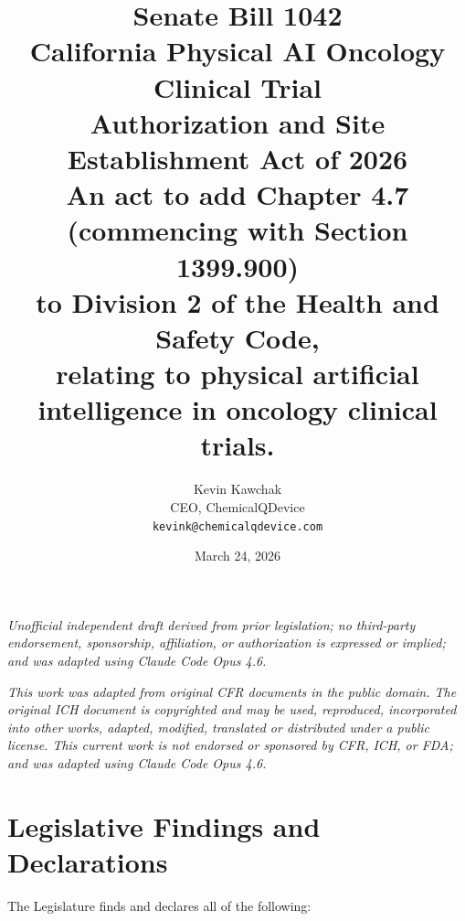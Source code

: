 \documentclass[11pt,letterpaper]{article}
\title{%
  \textbf{Senate Bill 1042}\\[6pt]
  \large California Physical AI Oncology Clinical Trial\\
  Authorization and Site Establishment Act of 2026\\[6pt]
  \normalsize An act to add Chapter 4.7 (commencing with Section 1399.900)\\
  to Division 2 of the Health and Safety Code,\\
  relating to physical artificial intelligence in oncology clinical trials.
}
\author{%
  Kevin Kawchak\\
  CEO, ChemicalQDevice\\
  \texttt{kevink@chemicalqdevice.com}
}
\date{March 24, 2026}
\begin{document}
\maketitle
\thispagestyle{fancy}

\begin{center}
\footnotesize
\textit{Unofficial independent draft derived from prior legislation;
no third-party endorsement, sponsorship, affiliation, or authorization
is expressed or implied; and was adapted using Claude Code Opus 4.6.}
\end{center}

\vspace{0.5em}

\begin{center}
\footnotesize
\textit{This work was adapted from original CFR documents in the public domain.
The original ICH document is copyrighted and may be used, reproduced,
incorporated into other works, adapted, modified, translated or distributed
under a public license. This current work is not endorsed or sponsored by
CFR, ICH, or FDA; and was adapted using Claude Code Opus 4.6.}
\end{center}

\vspace{1em}
\tableofcontents
\newpage

\section{Legislative Findings and Declarations}

The Legislature finds and declares all of the following:
\end{document}
